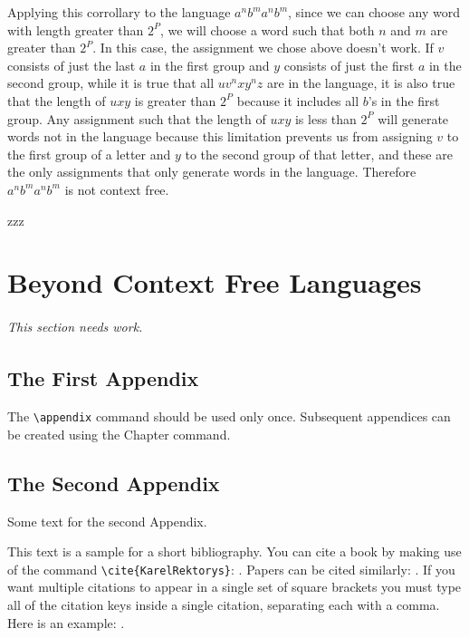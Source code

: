 \documentclass[letterpaper,12pt,openany,reqno]{book}%
\newcommand{\needswork}{\paragraph{This section needs work.}}
\begin{document}
Applying this corrollary to the language $a^nb^ma^nb^m$, since we can choose any word with length greater than $2^P$, we will choose a word such that both $n$ and $m$ are greater than $2^P$. In this case, the assignment we chose above doesn't work. If $v$ consists of just the last $a$ in the first group and $y$ consists of just the first $a$ in the second group, while it is true that all $uv^nxy^nz$ are in the language, it is also true that the length of $uxy$ is greater than $2^P$ because it includes all $b$'s in the first group. Any assignment such that the length of $uxy$ is less than $2^P$ will generate words not in the language because this limitation prevents us from assigning $v$ to the first group of a letter and $y$ to the second group of that letter, and these are the only assignments that only generate words in the language. Therefore $a^nb^ma^nb^m$ is not context free.

zzz

\part{Beyond Context Free Languages}
\label{C.Beyond.Context.Free}
\needswork{}

\appendix

\chapter{The First Appendix}

The \verb"\appendix" command should be used only once. Subsequent appendices can
be created using the Chapter command.

\chapter{The Second Appendix}

Some text for the second Appendix.

This text is a sample for a short bibliography. You can cite a book by making use of
the command \verb"\cite{KarelRektorys}": \cite{KarelRektorys}. Papers can be cited
similarly: \cite{Bertoti97}. If you want multiple citations to appear in a single set
of square brackets you must type all of the citation keys inside a single citation,
separating each with a comma. Here is an example: \cite{Bertoti97, Szeidl2001,
Carlson67}.
\end{document}
